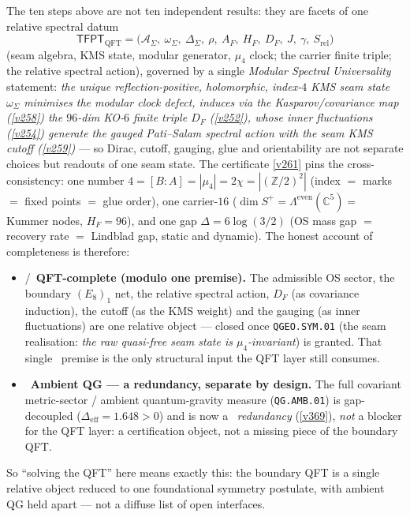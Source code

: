 \documentclass[11pt,a4paper]{article}
\newcommand{\Z}{\mathbb Z}
\begin{document}
\begin{keybox}
The ten steps above are not ten independent results: they are facets of one relative spectral datum
\[
  \boxed{\ \mathsf{TFPT}_{\mathrm{QFT}}=\bigl(\mathcal A_\Sigma,\ \omega_\Sigma,\ \Delta_\Sigma,\ \rho,\
  A_F,\ H_F,\ D_F,\ J,\ \gamma,\ S_{\mathrm{rel}}\bigr)\ }
\]
(seam algebra, KMS state, modular generator, $\mu_4$ clock; the carrier finite triple; the relative
spectral action), governed by a single \emph{Modular Spectral Universality} statement: \emph{the unique
reflection-positive, holomorphic, index-$4$ KMS seam state $\omega_\Sigma$ minimises the modular clock
defect, induces via the Kasparov/covariance map (\vref{v258}) the $96$-dim KO-$6$ finite triple $D_F$
(\vref{v252}), whose inner fluctuations (\vref{v254}) generate the gauged Pati--Salam spectral action with
the seam KMS cutoff (\vref{v259})} --- so Dirac, cutoff, gauging, glue and orientability are not separate
choices but readouts of one seam state. The certificate \vref{v261} pins the cross-consistency: one number
$4=[B{:}A]=|\mu_4|=2\chi=|(\Z/2)^2|$ (index $=$ marks $=$ fixed points $=$ glue order), one carrier-$16$
($\dim S^+=\Lambda^{\mathrm{even}}(\mathbb C^5)=$ Kummer nodes, $H_F=96$), and one gap
$\Delta=6\log(3/2)$ (OS mass gap $=$ recovery rate $=$ Lindblad gap, static and dynamic). The honest
account of completeness is therefore:
\begin{itemize}\setlength\itemsep{1pt}
\item \mE/\mC\ \textbf{QFT-complete (modulo one premise).} The admissible OS sector, the boundary
  $(E_8)_1$ net, the relative spectral action, $D_F$ (as covariance induction), the cutoff (as the KMS
  weight) and the gauging (as inner fluctuations) are one relative object --- closed once
  \texttt{QGEO.SYM.01} (the seam realisation: \emph{the raw quasi-free seam state is $\mu_4$-invariant}) is
  granted. That single \mO\ premise is the only structural input the QFT layer still consumes.
\item \mC\ \textbf{Ambient QG --- a redundancy, separate by design.} The full covariant metric-sector / ambient
  quantum-gravity measure (\texttt{QG.AMB.01}) is gap-decoupled ($\Delta_{\mathrm{eff}}=1.648>0$) and is now a
  \mC\ \emph{redundancy} (\vref{v369}), \emph{not} a blocker for the QFT layer: a certification object, not a
  missing piece of the boundary QFT.
\end{itemize}
So ``solving the QFT'' here means exactly this: the boundary QFT is a single relative object reduced to
one foundational symmetry postulate, with ambient QG held apart --- not a diffuse list of open interfaces.

\end{keybox}
\end{document}
